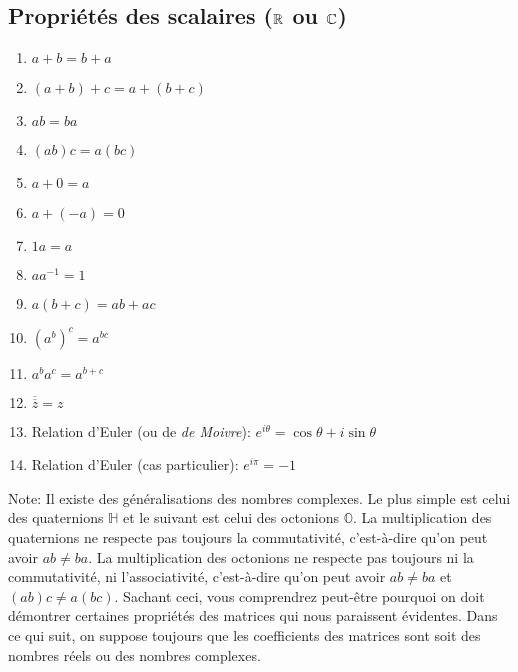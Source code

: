 \begin{adjmulticols}{1}{0in}{-2in}
\section{Propriétés des scalaires ($\mathbb{R}$ ou $\mathbb{C}$)}
\begin{enumerate}
\item $a+b = b+a$ \qquad {}
\item $(a+b) + c = a + (b+c)$ \qquad {}
\item $ab = ba$ \qquad {}
\item $(ab)c = a(bc)$ \qquad {}
\item $a + 0 = a$ \qquad {}
\item $a + (-a) = 0$ 
\item $1a = a$ \qquad {}
\item $a a^{-1} = 1$ 
\item $a(b+c) = ab + ac$ \qquad {}
\item $\left(a^b\right)^c = a^{bc}$ \qquad {}
\item $a^b a^c = a^{b+c}$ \qquad {}
\item $\overline{\overline{z}} = z$
\item Relation d'Euler (ou de \textit{de Moivre}): $e^{i\theta} = \cos\theta + i\sin\theta$
\item Relation d'Euler (cas particulier): $e^{i\pi} = -1$
\end{enumerate}

Note: Il existe des généralisations des nombres complexes. Le plus simple est celui des quaternions $\mathbb{H}$ et le suivant est celui des octonions $\mathbb{O}$.  La multiplication des quaternions ne respecte pas toujours la commutativité, c'est-à-dire qu'on peut avoir $ab\neq ba$.  La multiplication des octonions ne respecte
pas toujours ni la commutativité, ni l'associativité, c'est-à-dire qu'on peut avoir $ab\neq ba$ et $(ab)c \neq a(bc)$.
Sachant ceci, vous comprendrez peut-être pourquoi on doit démontrer certaines propriétés des matrices qui nous
paraissent évidentes. Dans ce qui suit, on suppose toujours que les coefficients des matrices sont soit des nombres réels ou des nombres complexes.


\end{adjmulticols}

